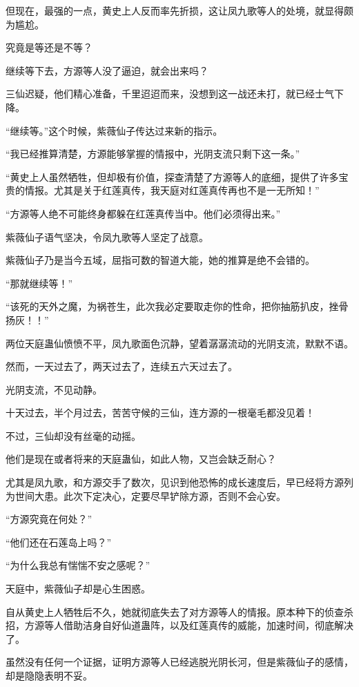 \begin{this_body}
但现在，最强的一点，黄史上人反而率先折损，这让凤九歌等人的处境，就显得颇为尴尬。

究竟是等还是不等？

继续等下去，方源等人没了逼迫，就会出来吗？

三仙迟疑，他们精心准备，千里迢迢而来，没想到这一战还未打，就已经士气下降。

“继续等。”这个时候，紫薇仙子传达过来新的指示。

“我已经推算清楚，方源能够掌握的情报中，光阴支流只剩下这一条。”

“黄史上人虽然牺牲，但却极有价值，探查清楚了方源等人的底细，提供了许多宝贵的情报。尤其是关于红莲真传，我天庭对红莲真传再也不是一无所知！”

“方源等人绝不可能终身都躲在红莲真传当中。他们必须得出来。”

紫薇仙子语气坚决，令凤九歌等人坚定了战意。

紫薇仙子乃是当今五域，屈指可数的智道大能，她的推算是绝不会错的。

“那就继续等！”

“该死的天外之魔，为祸苍生，此次我必定要取走你的性命，把你抽筋扒皮，挫骨扬灰！！”

两位天庭蛊仙愤愤不平，凤九歌面色沉静，望着潺潺流动的光阴支流，默默不语。

然而，一天过去了，两天过去了，连续五六天过去了。

光阴支流，不见动静。

十天过去，半个月过去，苦苦守候的三仙，连方源的一根毫毛都没见着！

不过，三仙却没有丝毫的动摇。

他们是现在或者将来的天庭蛊仙，如此人物，又岂会缺乏耐心？

尤其是凤九歌，和方源交手了数次，见识到他恐怖的成长速度后，早已经将方源列为世间大患。此次下定决心，定要尽早铲除方源，否则不会心安。

“方源究竟在何处？”

“他们还在石莲岛上吗？”

“为什么我总有惴惴不安之感呢？”

天庭中，紫薇仙子却是心生困惑。

自从黄史上人牺牲后不久，她就彻底失去了对方源等人的情报。原本种下的侦查杀招，方源等人借助洁身自好仙道蛊阵，以及红莲真传的威能，加速时间，彻底解决了。

虽然没有任何一个证据，证明方源等人已经逃脱光阴长河，但是紫薇仙子的感情，却是隐隐表明不妥。


\end{this_body}
